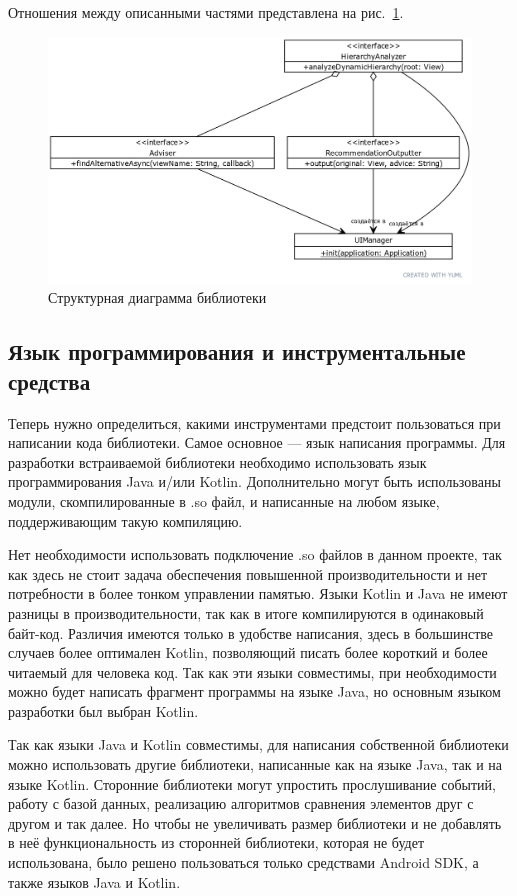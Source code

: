 \documentclass[a4paper,14pt]{extarticle} %
\begin{document}
	Отношения между описанными частями представлена на рис.~\ref{fig:uml_interfaces}.

	\begin{figure}[htb]
		\includegraphics[width=\textwidth]{uml_interfaces}
		\caption{Структурная диаграмма библиотеки}
		\label{fig:uml_interfaces}
	\end{figure}
	
	\subsection{Язык программирования и  инструментальные средства}
	
	Теперь нужно определиться, какими инструментами предстоит пользоваться при написании кода библиотеки. Самое основное --- язык написания программы. Для разработки встраиваемой библиотеки необходимо использовать язык программирования Java и/или Kotlin. Дополнительно могут быть использованы модули, скомпилированные в .so файл, и написанные на любом языке, поддерживающим такую компиляцию. 
	
	Нет необходимости использовать подключение .so файлов в данном проекте, так как здесь не стоит задача обеспечения повышенной производительности и нет потребности в более тонком управлении памятью. Языки Kotlin и Java не имеют разницы в производительности, так как в итоге компилируются в одинаковый байт-код. Различия имеются только в удобстве написания, здесь в большинстве случаев более оптимален Kotlin, позволяющий писать более короткий и более читаемый для человека код. Так как эти языки совместимы, при необходимости можно будет написать фрагмент программы на языке Java, но основным языком разработки был выбран Kotlin.
	
	Так как языки Java и Kotlin совместимы, для написания собственной библиотеки можно использовать другие библиотеки, написанные как на языке Java, так и на языке Kotlin. Сторонние библиотеки могут упростить прослушивание событий, работу с базой данных, реализацию алгоритмов сравнения элементов друг с другом и так далее. Но чтобы не увеличивать размер библиотеки и не добавлять в неё функциональность из сторонней библиотеки, которая не будет использована, было решено пользоваться только средствами Android SDK, а также языков Java и Kotlin.
	
\end{document}
